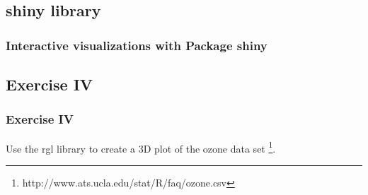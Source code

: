 \subsection{\ttfamily shiny \normalfont library} 
\begin{frame}[fragile]
	\frametitle{Interactive visualizations with Package \ttfamily shiny \normalfont}
\end{frame}

\subsection{Exercise IV}
\begin{frame}
	\frametitle{Exercise IV}
	Use the \ttfamily rgl \normalfont library to create a 3D plot of the \ttfamily ozone \normalfont data set \footnote{\ttfamily http://www.ats.ucla.edu/stat/R/faq/ozone.csv\normalfont}.
\end{frame}